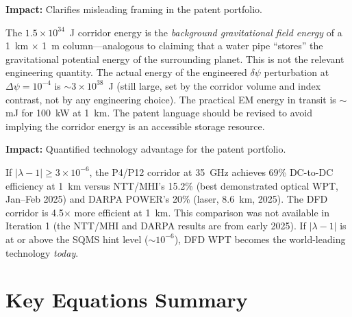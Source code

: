 \documentclass[aps,prd,twocolumn,superscriptaddress,nofootinbib]{revtex4-2}
\begin{document}
\begin{tcolorbox}[colback=red!5!white,colframe=red!75!black,
title={New Result \#4: Corridor Energy is Background Field, Not Engineering Budget}]
\textbf{Impact:} Clarifies misleading framing in the patent portfolio.

The $1.5\times10^{34}$~J corridor energy is the \emph{background gravitational
field energy} of a 1~km $\times$ 1~m column---analogous to claiming that a
water pipe ``stores'' the gravitational potential energy of the surrounding
planet.  This is not the relevant engineering quantity.  The actual energy
of the engineered $\delta\psi$ perturbation at $\Delta\psi = 10^{-4}$ is
$\sim 3\times10^{38}$~J (still large, set by the corridor volume and index
contrast, not by any engineering choice).  The practical EM energy
in transit is $\sim$mJ for 100~kW at 1~km.  The patent language should be
revised to avoid implying the corridor energy is an accessible storage resource.
\end{tcolorbox}

\begin{tcolorbox}[colback=purple!5!white,colframe=purple!75!black,
title={New Result \#5: DFD Outperforms Best Demonstrated WPT at 1~km by 4.5x}]
\textbf{Impact:} Quantified technology advantage for the patent portfolio.

If $|\lambda-1| \geq 3\times10^{-6}$, the P4/P12 corridor at 35~GHz achieves
69\% DC-to-DC efficiency at 1~km versus NTT/MHI's 15.2\% (best demonstrated
optical WPT, Jan--Feb 2025) and DARPA POWER's 20\% (laser, 8.6~km, 2025).
The DFD corridor is 4.5$\times$ more efficient at 1~km.  This comparison
was not available in Iteration 1 (the NTT/MHI and DARPA results are from
early 2025).  If $|\lambda-1|$ is at or above the SQMS hint level
($\sim10^{-6}$), DFD WPT becomes the world-leading technology \emph{today}.
\end{tcolorbox}


\appendix
\section{Key Equations Summary}
\end{document}
